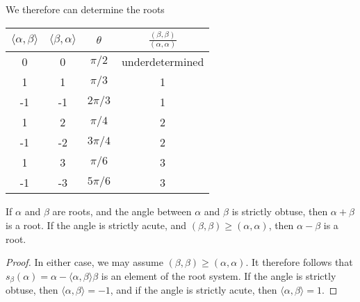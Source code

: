 We therefore can determine the roots

\begin{center}
\begin{tabular}{|c | c | c | c |}
    \hline
    $\langle \alpha, \beta \rangle$ & $\langle \beta, \alpha \rangle$ & $\theta$ & $\frac{(\beta, \beta)}{(\alpha, \alpha)}$\\
    \hline
    0 & 0 & $\pi/2$ & underdetermined\\
    1 & 1 & $\pi/3$ & 1\\
    -1 & -1 & $2\pi/3$ & 1\\
    1 & 2 & $\pi/4$ & 2\\
    -1 & -2 & $3\pi/4$ & 2\\
    1 & 3 & $\pi/6$ & 3\\
    -1 & -3 & $5\pi/6$ & 3\\
    \hline
\end{tabular}
\end{center}

\begin{theorem}
    If $\alpha$ and $\beta$ are roots, and the angle between $\alpha$ and $\beta$ is strictly obtuse, then $\alpha + \beta$ is a root. If the angle is strictly acute, and $(\beta, \beta) \geq (\alpha, \alpha)$, then $\alpha - \beta$ is a root.
\end{theorem}
\begin{proof}
    In either case, we may assume $(\beta, \beta) \geq (\alpha, \alpha)$. It therefore follows that $s_\beta(\alpha) = \alpha - \langle \alpha, \beta \rangle \beta$ is an element of the root system. If the angle is strictly obtuse, then $\langle \alpha, \beta \rangle = -1$, and if the angle is strictly acute, then $\langle \alpha, \beta \rangle = 1$.
\end{proof}

